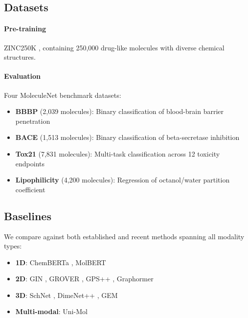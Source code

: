 \documentclass[11pt]{article}
\begin{document}
\subsection{Datasets}

\paragraph{Pre-training}
ZINC250K \citep{sterling2015zinc}, containing 250,000 drug-like molecules with diverse chemical structures.

\paragraph{Evaluation}
Four MoleculeNet \citep{wu2018moleculenet} benchmark datasets:
\begin{itemize}[leftmargin=*,itemsep=2pt]
    \item \textbf{BBBP} (2,039 molecules): Binary classification of blood-brain barrier penetration
    \item \textbf{BACE} (1,513 molecules): Binary classification of beta-secretase inhibition
    \item \textbf{Tox21} (7,831 molecules): Multi-task classification across 12 toxicity endpoints
    \item \textbf{Lipophilicity} (4,200 molecules): Regression of octanol/water partition coefficient
\end{itemize}

\subsection{Baselines}

We compare against both established and recent methods spanning all modality types:
\begin{itemize}[leftmargin=*,itemsep=2pt]
    \item \textbf{1D}: ChemBERTa \citep{chithrananda2020chemberta}, MolBERT \citep{fabian2020molecular}
    \item \textbf{2D}: GIN \citep{xu2019powerful}, GROVER \citep{rong2020grover}, GPS++ \citep{masters2023gps}, Graphormer \citep{ying2021transformers}
    \item \textbf{3D}: SchNet \citep{schutt2017schnet}, DimeNet++ \citep{gasteiger2020directional}, GEM \citep{fang2022geometry}
    \item \textbf{Multi-modal}: Uni-Mol \citep{zhou2023unimol}
\end{itemize}
\end{document}
